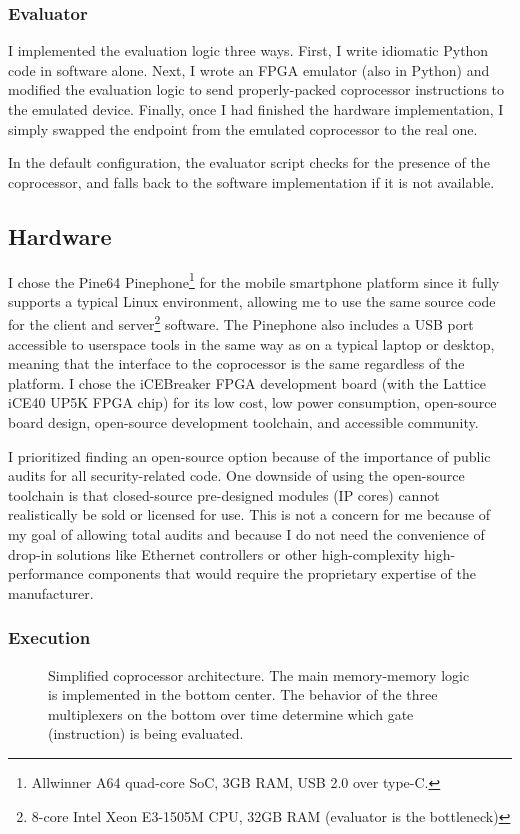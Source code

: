 \subsubsection{Evaluator}
I implemented the evaluation logic three ways. First, I write idiomatic Python code in software alone. Next, I wrote an FPGA emulator (also in Python) and modified the evaluation logic to send properly-packed coprocessor instructions to the emulated device. Finally, once I had finished the hardware implementation, I simply swapped the endpoint from the emulated coprocessor to the real one.

In the default configuration, the evaluator script checks for the presence of the coprocessor, and falls back to the software implementation if it is not available.

\subsection{Hardware}\label{sec:hw}
I chose the Pine64 Pinephone\cite{Pinephone}\footnote{Allwinner A64 quad-core SoC, 3GB RAM, USB 2.0 over type-C.} for the mobile smartphone platform since it fully supports a typical Linux environment, allowing me to use the same source code for the client and server\footnote{8-core Intel Xeon E3-1505M CPU, 32GB RAM (evaluator is the bottleneck)} software. The Pinephone also includes a USB port accessible to userspace tools in the same way as on a typical laptop or desktop, meaning that the interface to the coprocessor is the same regardless of the platform. I chose the iCEBreaker FPGA development board\cite{iCEBreaker} (with the Lattice iCE40 UP5K FPGA chip\cite{LatticePage}) for its low cost, low power consumption, open-source board design, open-source development toolchain, and accessible community.

I prioritized finding an open-source option because of the importance of public audits for all security-related code. One downside of using the open-source toolchain is that closed-source pre-designed modules (IP cores) cannot realistically be sold or licensed for use. This is not a concern for me because of my goal of allowing total audits and because I do not need the convenience of drop-in solutions like Ethernet controllers or other high-complexity high-performance components that would require the proprietary expertise of the manufacturer.

\subsubsection{Execution}
\begin{figure}
	\centering
	
	\caption{Simplified coprocessor architecture. The main memory-memory logic is implemented in the bottom center. The behavior of the three multiplexers on the bottom over time determine which gate (instruction) is being evaluated.}%
	\label{fig:arch}
\end{figure}

